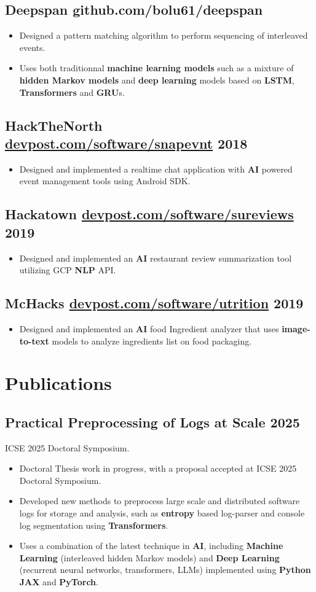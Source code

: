 \documentclass[10pt,letterpaper]{article}
\newcommand{\datedsubsection}[2]{\subsection[#1]{#1 \hfill #2}}
\renewcommand{\emph}[1]{{\color{emphcolor}\bfseries#1}}
\begin{document}
\subsection{Deepspan github.com/bolu61/deepspan}
\begin{itemize}
    \item Designed a pattern matching algorithm to perform sequencing of interleaved events.
    \item Uses both traditionnal \emph{machine learning models} such as a
    mixture of \emph{hidden Markov models} and \emph{deep learning} models based
    on \emph{LSTM}, \emph{Transformers} and \emph{GRU}s.
\end{itemize}

\datedsubsection{HackTheNorth \href{https://devpost.com/software/snapevnt}{devpost.com/software/snapevnt}}{2018}
\begin{itemize}
    \item Designed and implemented a realtime chat application with \emph{AI} powered
    event management tools using Android SDK.
\end{itemize}
\datedsubsection{Hackatown \href{https://devpost.com/software/sureviews}{devpost.com/software/sureviews}}{2019}
\begin{itemize}
    \item Designed and implemented an \emph{AI} restaurant review summarization
    tool utilizing GCP \emph{NLP} API.
\end{itemize}
\datedsubsection{McHacks \href{https://devpost.com/software/utrition}{devpost.com/software/utrition}}{2019}
\begin{itemize}
    \item Designed and implemented an \emph{AI} food Ingredient analyzer that
    uses \emph{image-to-text} models to analyze ingredients list on food
    packaging.
\end{itemize}

\section{Publications}

\datedsubsection{Practical Preprocessing of Logs at Scale}{2025}
\noindent ICSE 2025 Doctoral Symposium.
\begin{itemize}
    \item Doctoral Thesis work in progress, with a proposal accepted at ICSE 2025 Doctoral Symposium.
    \item Developed new methods to preprocess large scale and distributed
    software logs for storage and analysis, such as \emph{entropy} based
    log-parser and console log segmentation using \emph{Transformers}.
    \item Uses a combination of the latest technique in \emph{AI}, including
    \emph{Machine Learning} (interleaved hidden Markov models) and \emph{Deep
    Learning} (recurrent neural networks, transformers, LLMs) implemented using
    \emph{Python} \emph{JAX} and \emph{PyTorch}.
\end{itemize}
\end{document}
